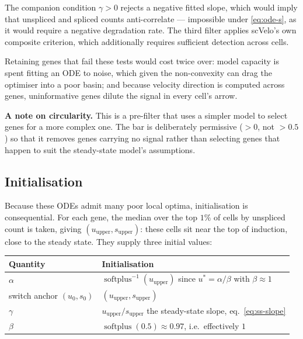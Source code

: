 \documentclass[11pt,a4paper]{article}
\newenvironment{keybox}{\begin{shaded}\noindent}{\end{shaded}}
\newcommand{\uns}{u}
\newcommand{\spl}{s}
\newcommand{\softplus}{\operatorname{softplus}}
\theoremstyle{definition}
\begin{document}
The companion condition $\gamma > 0$ rejects a negative fitted slope, which
would imply that unspliced and spliced counts anti-correlate --- impossible
under \eqref{eq:ode-s}, as it would require a negative degradation rate. The
third filter applies scVelo's own composite criterion, which additionally
requires sufficient detection across cells.

Retaining genes that fail these tests would cost twice over: model capacity is
spent fitting an ODE to noise, which given the non-convexity can drag the
optimiser into a poor basin; and because velocity direction is computed across
genes, uninformative genes dilute the signal in every cell's arrow.

\begin{keybox}
\textbf{A note on circularity.} This is a pre-filter that uses a simpler model
to select genes for a more complex one. The bar is deliberately permissive
($>0$, not $>0.5$) so that it removes genes carrying no signal rather than
selecting genes that happen to suit the steady-state model's assumptions.
\end{keybox}

\subsection{Initialisation}
\label{sec:init}

Because these ODEs admit many poor local optima, initialisation is
consequential. For each gene, the median over the top $1\%$ of cells by
unspliced count is taken, giving $(\uns_{\text{upper}}, \spl_{\text{upper}})$:
these cells sit near the top of induction, close to the steady state. They
supply three initial values:

\begin{center}
\begin{tabular}{@{}ll@{}}
\toprule
\textbf{Quantity} & \textbf{Initialisation} \\
\midrule
$\alpha$ & $\softplus^{-1}(\uns_{\text{upper}})$ \quad since $\uns^{*} = \alpha/\beta$ with $\beta \approx 1$ \\
switch anchor $(\uns_0, \spl_0)$ & $(\uns_{\text{upper}}, \spl_{\text{upper}})$ \\
$\gamma$ & $\uns_{\text{upper}} / \spl_{\text{upper}}$ \quad the steady-state slope, eq.~\eqref{eq:ss-slope} \\
$\beta$ & $\softplus(0.5) \approx 0.97$, i.e.\ effectively $1$ \\
\bottomrule
\end{tabular}
\end{center}
\end{document}
